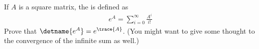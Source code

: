 If $A$ is a square matrix, the  is defined as
%
\begin{align*}
e^{A}=\sum_{i=0}^{\infty}\frac{A^i}{i!}
\end{align*}
%
Prove that $\detname{e^A}=e^{\trace{A}}$.  (You might want to give some thought to the convergence of the infinite sum as well.)